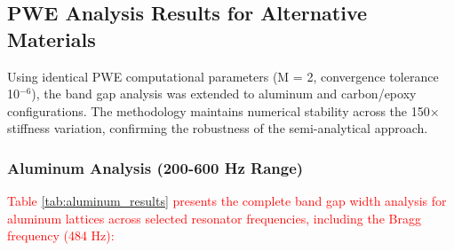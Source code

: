 \documentclass[review,numbers,sort&compress]{elsarticle}
\begin{document}
\subsection{PWE Analysis Results for Alternative Materials}

Using identical PWE computational parameters (M = 2, convergence tolerance 10$^{-6}$), the band gap analysis was extended to aluminum and carbon/epoxy configurations. The methodology maintains numerical stability across the 150× stiffness variation, confirming the robustness of the semi-analytical approach.

\subsubsection{Aluminum Analysis (200-600 Hz Range)}

\textcolor{red}{Table \ref{tab:aluminum_results} presents the complete band gap width analysis for aluminum lattices across selected resonator frequencies, including the Bragg frequency (484 Hz):}
\end{document}
